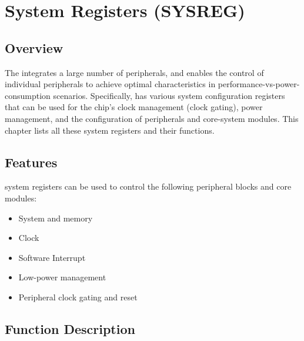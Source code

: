 \documentclass[main\_\_EN.tex]{subfiles}
\begin{document}

\ifglobal
\else
    {\let\clearpage\relax \listoftodos}
    \tableofcontents
\fi



\chapter{System Registers (SYSREG)}
\label{mod:sysreg}
\hypertarget{sysreg}{}

\section{Overview}

The \chipname{} integrates a large number of peripherals, and enables the control of individual peripherals to achieve optimal characteristics in performance-vs-power-consumption scenarios. Specifically, \chipname{} has various system configuration registers that can be used for the chip's clock management (clock gating), power management, and the configuration of peripherals and core-system modules. This chapter lists all these system registers and their functions.

\section{Features}

\chipname{} system registers can be used to control the following peripheral blocks and core modules:

\begin{itemize}
    \item System and memory
    \item Clock
    \item Software Interrupt
    \item Low-power management
    \item Peripheral clock gating and reset
\end{itemize}


\section{Function Description}
\end{document}
